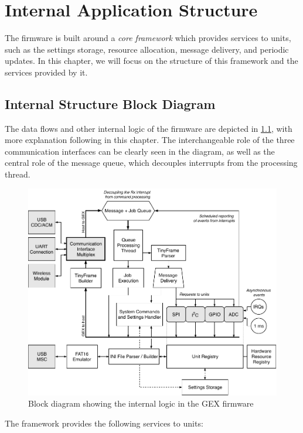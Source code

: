 \chapter{Internal Application Structure} \label{sec:coreframework}

The firmware is built around a \textit{core framework} which provides services to units, such as the settings storage, resource allocation, message delivery, and periodic updates. In this chapter, we will focus on the structure of this framework and the services provided by it.

\section{Internal Structure Block Diagram}

The data flows and other internal logic of the firmware are depicted in \cref{fig:gex_internal}, with more explanation following in this chapter. The interchangeable role of the three communication interfaces can be clearly seen in the diagram, as well as the central role of the message queue, which decouples interrupts from the processing thread.

\begin{figure}[h]
	\centering
	\includegraphics[width=\textwidth] {img/gex-internal.pdf}
	\caption{\label{fig:gex_internal}Block diagram showing the internal logic in the GEX firmware}
\end{figure}

\noindent
The framework provides the following services to units:

